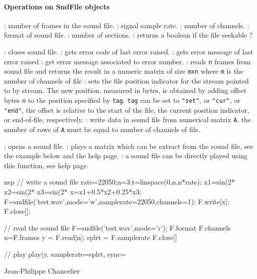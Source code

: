 \paragraph{Operations on SndFile objects}
\begin{itemize}
  : number of frames in the sound file. 
  : signal sample rate.
  : number of channels. 
  :  format of sound file. 
  : number of sections.
  : returns a boolean if the file seekable ? 
\end{itemize}
\begin{itemize}
  : closes sound file. 
  : gets error code of last error raised. 
  : gets error message of last error raised
  : get error message associated to error number.
  :  reads \verb+n+ frames from sound file and returns the 
  result in a numeric matrix of size \verb+mxn+ where \verb+m+ is the 
  number of channels of file
  : sets the file position indicator for the stream pointed
       to by stream.  The new position, measured in bytes, is obtained  by  adding
       offset  bytes \verb+n+  to  the  position  specified by \verb+tag+. 
        \verb+tag+ can be set to \verb+"set"+, or \verb+"cur"+, or \verb+"end"+, 
	the offset is relative to the start of the
       file, the current position indicator, or end-of-file, respectively.
  : write data in sound file from numerical matrix \verb+A+. 
  the number of rows of \verb+A+ must be equal to number of channels of file.
\end{itemize}

\begin{itemize}
  ; opens a sound file. 
  : plays a matrix which can be extract from the sound file, see the example below and the  help page.
  : a sound file can be directly played using this function, see  help page.
\end{itemize}

\begin{examples}
  \begin{mintednsp}{nsp}
    // write a sound file
    rate=22050;n=3;t=linspace(0,n,n*rate);
    x1=sin(2*%
    x2=sin(2*%
    x3=sin(2*%
    x=x1+0.5*x2+0.25*x3;
    F=sndfile('test.wav',mode='w',samplerate=22050,channels=1);
    F.write[x];
    F.close[];

    // read the sound file
    F=sndfile('test.wav',mode='r');
    F.format
    F.channels
    n=F.frames
    y = F.read[n];
    splrt = F.samplerate
    F.close[]

    // play 
    play(y, samplerate=splrt, sync=%
  \end{mintednsp}
\end{examples}

\begin{manseealso}

\end{manseealso}

\begin{authors}
  Jean-Philippe Chancelier 
\end{authors}


